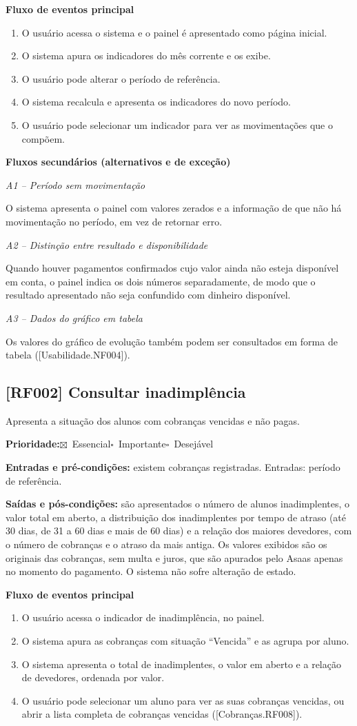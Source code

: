 \documentclass[11pt,a4paper,oneside]{report}
\newcommand{\req}[2]{%
  \subsection*{[#1] #2}%
  \addcontentsline{toc}{subsection}{[#1] #2}}
\newcommand{\marcado}{$\boxtimes$}
\newcommand{\vazio}{$\square$}
\newcommand{\prioE}{\par\textbf{Prioridade:}\quad\marcado~Essencial\quad\vazio~Importante\quad\vazio~Desejável\par}
\newcommand{\entradas}{\textbf{Entradas e pré-condições:} }
\newcommand{\saidas}{\par\textbf{Saídas e pós-condições:} }
\newcommand{\fluxoprincipal}{\par\textbf{Fluxo de eventos principal}\par}
\newcommand{\fluxossecundarios}{\par\textbf{Fluxos secundários (alternativos e de exceção)}\par}
\newcommand{\fluxo}[2]{\par\smallskip\textit{#1 -- #2}\par}
\begin{document}
\fluxoprincipal
\begin{enumerate}
  \item O usuário acessa o sistema e o painel é apresentado como página inicial.
  \item O sistema apura os indicadores do mês corrente e os exibe.
  \item O usuário pode alterar o período de referência.
  \item O sistema recalcula e apresenta os indicadores do novo período.
  \item O usuário pode selecionar um indicador para ver as movimentações que o compõem.
\end{enumerate}

\fluxossecundarios

\fluxo{A1}{Período sem movimentação}
O sistema apresenta o painel com valores zerados e a informação de que não há movimentação no
período, em vez de retornar erro.

\fluxo{A2}{Distinção entre resultado e disponibilidade}
Quando houver pagamentos confirmados cujo valor ainda não esteja disponível em conta, o painel
indica os dois números separadamente, de modo que o resultado apresentado não seja confundido com
dinheiro disponível.

\fluxo{A3}{Dados do gráfico em tabela}
Os valores do gráfico de evolução também podem ser consultados em forma de tabela
([Usabilidade.NF004]).

\req{RF002}{Consultar inadimplência}

Apresenta a situação dos alunos com cobranças vencidas e não pagas.

\prioE

\entradas existem cobranças registradas. Entradas: período de referência.

\saidas são apresentados o número de alunos inadimplentes, o valor total em aberto, a distribuição
dos inadimplentes por tempo de atraso (até 30 dias, de 31 a 60 dias e mais de 60 dias) e a relação
dos maiores devedores, com o número de cobranças e o atraso da mais antiga. Os valores exibidos são
os originais das cobranças, sem multa e juros, que são apurados pelo Asaas apenas no momento do
pagamento. O sistema não sofre alteração de estado.

\fluxoprincipal
\begin{enumerate}
  \item O usuário acessa o indicador de inadimplência, no painel.
  \item O sistema apura as cobranças com situação ``Vencida'' e as agrupa por aluno.
  \item O sistema apresenta o total de inadimplentes, o valor em aberto e a relação de devedores,
        ordenada por valor.
  \item O usuário pode selecionar um aluno para ver as suas cobranças vencidas, ou abrir a lista
        completa de cobranças vencidas ([Cobranças.RF008]).
\end{enumerate}
\end{document}
